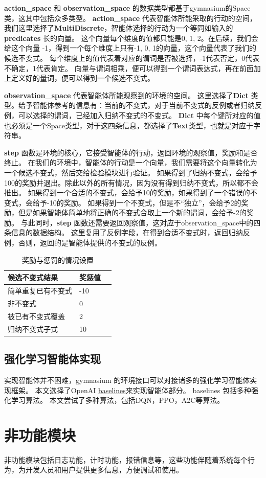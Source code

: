 \textbf{action\_space} 和 \textbf{observation\_space} 的数据类型都基于gymnasium的Space类，这其中包括众多类型。
\textbf{action\_space} 代表智能体所能采取的行动的空间，我们这里选择了\textbf{MultiDiscrete}，智能体选择的行动为一个等同如输入的 \textbf{predicates} 长的向量。
这个向量每个维度的值都只能是0, 1, 2。在后续，我们会给这个向量 -1，得到一个每个维度上只有-1, 0, 1的向量，这个向量代表了我们的候选不变式。
每个维度上的值代表着对应的谓词是否被选择，-1代表否定，0代表不确定，1代表肯定。
向量与谓词相乘，便可以得到一个谓词表达式，再在前面加上定义好的量词，便可以得到一个候选不变式。

\textbf{observation\_space} 代表智能体所能观察到的环境的空间。
这里选择了\textbf{Dict} 类型。给予智能体参考的信息有：当前的不变式，对于当前不变式的反例或者归纳反例，可以选择的谓词，已经加入归纳不变式的不变式。
\textbf{Dict} 中每个键所对应的值也必须是一个Space类型，对于这四条信息，都选择了\textbf{Text}类型，也就是对应于字符串。

\textbf{step} 函数是环境的核心，它接受智能体的行动，返回环境的观察值，奖励和是否终止。
在我们的环境中，智能体的行动是一个向量，我们需要将这个向量转化为一个候选不变式，然后交给检验模块进行验证。
如果得到了归纳不变式，会给予100的奖励并退出。除此以外的所有情况，因为没有得到归纳不变式，所以都不会推出。
如果得到一个合适的不变式，会给予10的奖励，如果得到了一个错误的不变式，会给予-10的奖励。
如果得到一个不变式，但是不“独立”，会给予2的奖励，但是如果智能体简单地将正确的不变式合取上一个新的谓词，会给予-2的奖励。
与此同时，\textbf{step} 函数还需要返回观察值，这对应于observation\_space中的四条信息的数据结构。
这里复用了反例字段，在得到合适不变式时，返回归纳反例，否则，返回的是智能体提供的不变式的反例。
\begin{table}[!h]
    \label{table:award_punish}
	\centering
	\caption{奖励与惩罚的情况设置}
	\label{tab::situation}
	\renewcommand\arraystretch{1.4}
	\begin{tabular}{p{}p{}p{}}
		\toprule
		\textbf{候选不变式结果}   & \textbf{奖惩值} \\ 
        \midrule
		简单重复已有不变式 & -10 \\
		非不变式      & 0   \\
		被已有不变式覆盖  & 2   \\
		归纳不变式子式   & 10 \\
        \bottomrule
	\end{tabular}
\end{table}

\subsection{强化学习智能体实现}

实现智能体并不困难，gymnasium 的环境接口可以对接诸多的强化学习智能体实现框架。
本文选择了OpenAI \href{https://github.com/openai/baselines}{baselines}\cite{baselines}来实现智能体部分。
baselines 包括多种强化学习算法。
本文尝试了多种算法，包括DQN，PPO，A2C等算法。

\section{非功能模块}

非功能模块包括日志功能，计时功能，报错信息等，这些功能伴随着系统每个行为，为开发人员和用户提供更多信息，方便调试和使用。